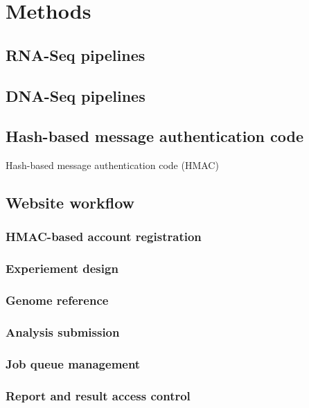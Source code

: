 \chapter{Methods}
\label{c:method}

\section{RNA-Seq pipelines}

\section{DNA-Seq pipelines}

\section{Hash-based message authentication code}

Hash-based message authentication code (HMAC)

\section{Website workflow}

\subsection{HMAC-based account registration}

\subsection{Experiement design}

\subsection{Genome reference}

\subsection{Analysis submission}

\subsection{Job queue management}

\subsection{Report and result access control}

